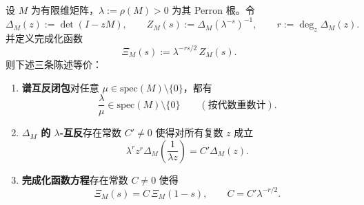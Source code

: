 \begin{proposition}\label{prop:reciprocal-spectrum-functional-equation}
设 $M$ 为有限维矩阵，$\lambda:=\rho(M)>0$ 为其 Perron 根。令
\[
\Delta_M(z):=\det(I-zM),\qquad
Z_M(s):=\Delta_M(\lambda^{-s})^{-1},
\qquad
r:=\deg_z\Delta_M(z).
\]
并定义完成化函数
\[
\Xi_M(s):=\lambda^{-rs/2}\,Z_M(s).
\]
则下述三条陈述等价：
\begin{enumerate}
  \item \textbf{谱互反闭包}对任意 \(\mu\in\mathrm{spec}(M)\setminus\{0\}\)，都有
  \[
  \frac{\lambda}{\mu}\in\mathrm{spec}(M)\setminus\{0\}
  \qquad(\text{按代数重数计}).
  \]
  \item \textbf{\(\Delta_M\) 的 \(\lambda\)-互反}存在常数 \(C'\neq 0\) 使得对所有复数 \(z\) 成立
  \[
  \lambda^{r}z^{r}\Delta_M\!\left(\frac{1}{\lambda z}\right)=C'\Delta_M(z).
  \]
  \item \textbf{完成化函数方程}存在常数 \(C\neq 0\) 使得
  \[
  \Xi_M(s)=C\,\Xi_M(1-s),
  \qquad C=C'\lambda^{-r/2}.
  \]
\end{enumerate}
\end{proposition}

